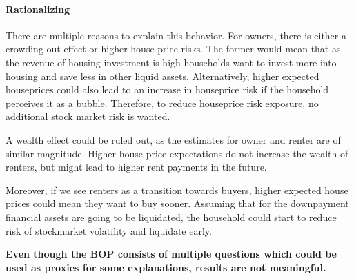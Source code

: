 \documentclass[ProjectABM]{subfiles}
\begin{document}






\paragraph{Rationalizing}
There are multiple reasons to explain this behavior. For owners, there is either a crowding out effect or higher house price risks. The former would mean that as the revenue of housing investment is high households want to invest more into housing and save less in other liquid assets. Alternatively, higher expected houseprices could also lead to an increase in houseprice risk if the household perceives it as a bubble. Therefore, to reduce houseprice risk exposure, no additional stock market risk is wanted.

A wealth effect could be ruled out, as the estimates for owner and renter are of similar magnitude. Higher house price expectations do not increase the wealth of renters, but might lead to higher rent payments in the future. 

Moreover, if we see renters as a transition towards buyers, higher expected house prices could mean they want to buy sooner. Assuming that for the downpayment financial assets are going to be liquidated, the household could start to reduce risk of stockmarket volatility and liquidate early.

\textbf{Even though the BOP consists of multiple questions which could be used as proxies for some explanations, results are not meaningful.}

\end{document}
